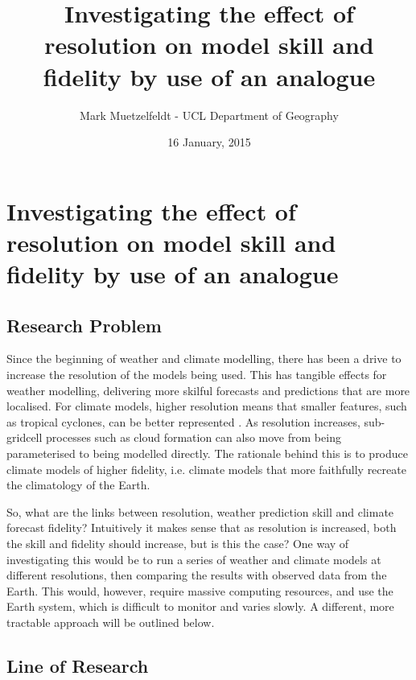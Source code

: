\documentclass[12pt,a4paper]{article}
\title{Investigating the effect of resolution on model skill and fidelity by use of an analogue}
\author{Mark Muetzelfeldt - UCL Department of Geography}
\date{16 January, 2015}
\newcommand{\ts}{\textsuperscript}
\begin{document}
\section*{Investigating the effect of resolution on model skill and fidelity by use of an analogue}




\subsection*{Research Problem}

Since the beginning of weather and climate modelling, there has been a drive to increase the
resolution of the models being used. This has tangible effects for weather modelling, delivering
more skilful forecasts \cite{buizza2003benefits} and predictions that are more localised. For
climate models, higher resolution means that smaller features, such as tropical cyclones, can be
better represented \cite{bengtsson1995hurricane}. As resolution increases, sub-gridcell processes such as cloud formation can also
move from being parameterised to being modelled directly. The rationale behind this is to produce
climate models of higher fidelity, i.e. climate models that more faithfully recreate the climatology
of the Earth.

So, what are the links between resolution, weather prediction skill and climate forecast fidelity?
Intuitively it makes sense that as resolution is increased, both the skill and fidelity should
increase, but is this the case? One way of investigating this would be to run a series of weather
and climate models at different resolutions, then comparing the results with observed data from the
Earth. This would, however, require massive computing resources, and use the Earth system, which is
difficult to monitor and varies slowly. A different, more tractable approach will be outlined below.

\subsection*{Line of Research}
\end{document}
